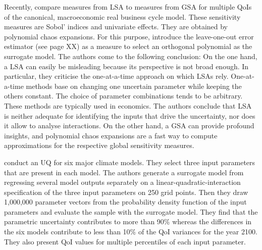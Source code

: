 \documentclass[a4paper,12pt]{article}
\begin{document}
Recently, \cite{Harenberg.2019} compare measures from LSA to measures from GSA for multiple QoIs of the canonical, macroeconomic real business cycle model. These sensitivity measures are Sobol' indices and univariate effects. They are obtained by polynomial chaos expansions. For this purpose, \citeauthor{Harenberg.2019} introduce the leave-one-out error estimator (see page XX) as a measure to select an orthogonal polynomial as the surrogate model. The authors come to the following conclusion: On the one hand, a LSA can easily be misleading because its perspective is not broad enough. In particular, they criticise the one-at-a-time approach on which LSAs rely. One-at-a-time methods base on changing one uncertain parameter while keeping the others constant. The choice of parameter combinations tends to be arbitrary. These methods are typically used in economics. The authors conclude that LSA is neither adequate for identifying the inputs that drive the uncertainty, nor does it allow to analyse interactions. On the other hand, a GSA can provide profound insights, and polynomial chaos expansions are a fast way to compute approximations for the respective global sensitivity measures.

\cite{Gillingham.2015} conduct an UQ for six major climate models. They select three input parameters that are present in each model. The authors generate a surrogate model from regressing several model outputs separately on a linear-quadratic-interaction specification of the three input parameters on 250 grid points. Then they draw 1,000,000 parameter vectors from the probability density function of the input parameters and evaluate the sample with the surrogate model. They find that the parametric uncertainty contributes to more than 90\% whereas the differences in the six models contribute to less than 10\% of the QoI variances for the year 2100. They also present QoI values for multiple percentiles of each input parameter.
\end{document}
